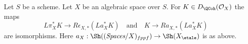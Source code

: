 %
\begin{lemma}
\label{lemma-cohomological-descent-etale-fppf-modules-unbounded}
Let $S$ be a scheme. Let $X$ be an algebraic space over $S$.
For $K \in D_\QCoh(\mathcal{O}_X)$ the maps
$$
L\pi_X^*K \longrightarrow R\epsilon_{X, *}(La_X^*K)
\quad\text{and}\quad
K \longrightarrow Ra_{X, *}(La_X^*K)
$$
are isomorphisms. Here
$a_X : \Sh((\textit{Spaces}/X)_{fppf}) \to \Sh(X_\etale)$ is as above.
\end{lemma}

